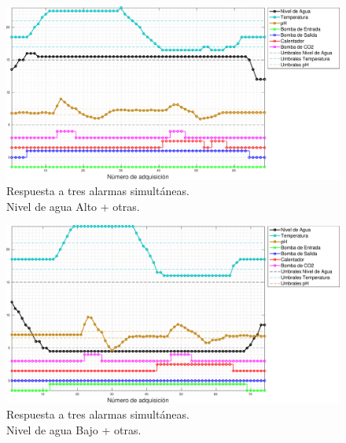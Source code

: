\begin{figure}
\centering
    \includegraphics[width=\textwidth]{./Figures/plot3waterHigh.pdf}
	\caption{Respuesta a tres alarmas simultáneas.\\ Nivel de agua Alto + otras.}
	\label{fig:alarma3WaterHigh}
\end{figure}

\begin{figure}
\centering
    \includegraphics[width=\textwidth]{./Figures/plot3waterLow.pdf}
	\caption{Respuesta a tres alarmas simultáneas.\\ Nivel de agua Bajo + otras.}
	\label{fig:alarma3WaterLow}
\end{figure}
